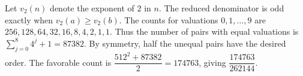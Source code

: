 Let $v_2(n)$ denote the exponent of $2$ in $n$. The reduced denominator is odd exactly when $v_2(a)\ge v_2(b)$. The counts for valuations $0,1,\ldots,9$ are $256,128,64,32,16,8,4,2,1,1$. Thus the number of pairs with equal valuations is $\sum_{j=0}^{8}4^j+1=87382$. By symmetry, half the unequal pairs have the desired order. The favorable count is $\dfrac{512^2+87382}{2}=174763$, giving $\boxed{\dfrac{174763}{262144}}$.
